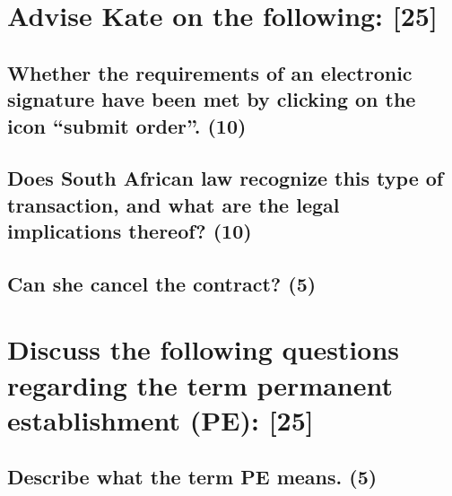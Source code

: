 \documentclass[11pt]{article}
\begin{document}
\section{Advise Kate on the following: [25]}
\label{sec:org910ac7e}

\subsection{Whether the requirements of an electronic signature have been met by clicking on the icon ``submit order''. (10)}
\label{sec:org1527dfb}

\subsection{Does South African law recognize this type of transaction, and what are the legal implications thereof? (10)}
\label{sec:org2293a88}

\subsection{Can she cancel the contract? (5)}
\label{sec:org222f69f}

\section{Discuss the following questions regarding the term permanent establishment (PE): [25]}
\label{sec:org0497c7e}

\subsection{Describe what the term PE means. (5)}
\label{sec:orgdd29933}
\end{document}
